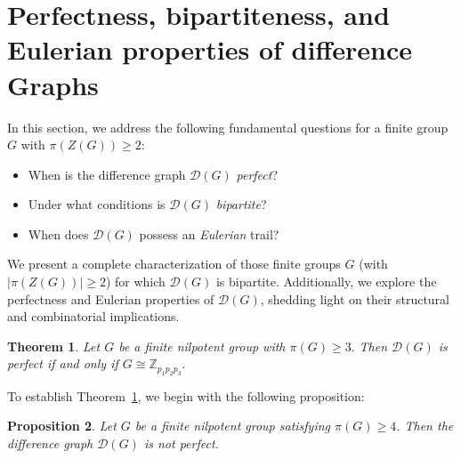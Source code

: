 \documentclass[12pt]{amsart}
\theoremstyle{plain}
\newtheorem{theorem}{Theorem}[section]
\newtheorem{proposition}[theorem]{Proposition}
\theoremstyle{remark}
\newtheorem{remark}[theorem]{Remark}
\theoremstyle{definition}
\begin{document}

\section{Perfectness, bipartiteness, and Eulerian properties of difference Graphs}
\label{sec:perfect-bipartite-eulerian-diff-graph}
In this section, we address the following fundamental questions for a finite group \(G\) with \(\pi(Z(G)) \ge 2\):

\begin{itemize}
  \item When is the difference graph \(\mathcal{D}(G)\) \emph{perfect}?
  \item Under what conditions is \(\mathcal{D}(G)\) \emph{bipartite}?
  \item When does \(\mathcal{D}(G)\) possess an \emph{Eulerian} trail?
\end{itemize}

We present a complete characterization of those finite groups \(G\) (with \(|\pi(Z(G))|\ge2\)) for which \(\mathcal{D}(G)\) is bipartite. Additionally, we explore the perfectness and Eulerian properties of \(\mathcal{D}(G)\), shedding light on their structural and combinatorial implications.

\begin{theorem}\label{t:nilp}
Let $G$ be a finite nilpotent group with $\pi(G)\geq 3.$ Then $\mathcal{D}(G)$ is perfect if and only if $G\cong\mathbb{Z}_{p_1p_2p_3}.$    
\end{theorem}


To establish Theorem~\ref{t:nilp}, we begin with the following proposition:

\begin{proposition}\label{t:nilp_imperf}
Let \(G\) be a finite nilpotent group satisfying \(\pi(G) \ge 4\). Then the difference graph \(\mathcal{D}(G)\) is not perfect.
\end{proposition}
\end{document}
